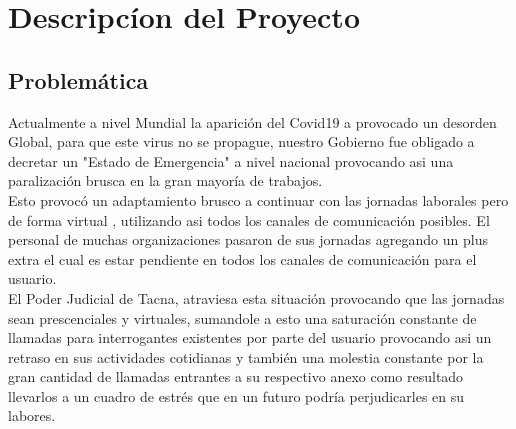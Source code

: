 \documentclass[twoside,twocolumn]{article}
\begin{document}
\section{Descripcíon del Proyecto}
\subsection{Problemática}
Actualmente a nivel Mundial la aparición del Covid19 a provocado un desorden Global, para que este virus no se propague, nuestro Gobierno fue obligado a decretar un "Estado de Emergencia" a nivel nacional provocando asi una paralización brusca en la gran mayoría de trabajos.
\\
Esto provocó un adaptamiento brusco a continuar con las jornadas laborales pero de forma virtual , utilizando asi todos los canales de comunicación posibles.
El personal de muchas organizaciones pasaron de sus jornadas agregando un plus extra el cual es estar pendiente en todos los canales de comunicación para el usuario.
\\
El Poder Judicial de Tacna, atraviesa esta situación provocando que las jornadas sean prescenciales y virtuales, sumandole a esto una saturación constante de llamadas para  interrogantes existentes por parte del usuario provocando asi un retraso en sus actividades cotidianas y también una molestia constante por la gran cantidad de llamadas entrantes a su respectivo anexo como resultado llevarlos a un cuadro de estrés que en un futuro podría perjudicarles en su labores.
\end{document}
